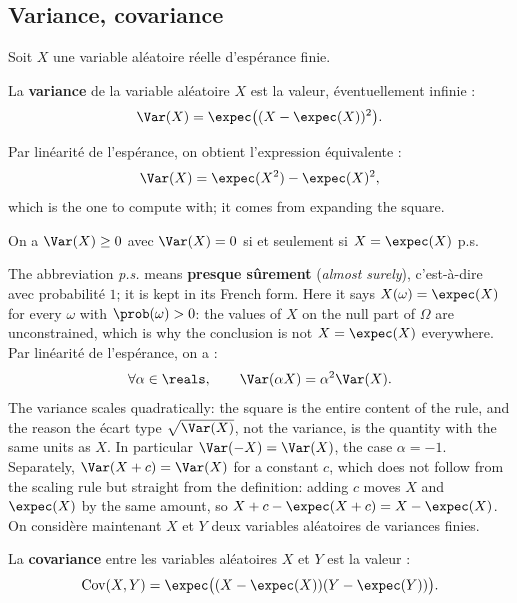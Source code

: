 \subsection{Variance, covariance}

Soit $X$ une variable aléatoire réelle d'espérance finie.

\begin{definition}[Variance]
  La \textbf{variance} de la variable aléatoire $X$ est la valeur, éventuellement
  infinie :
  \[ \Var(X) = \expec\big( (X - \expec(X))^{2} \big). \]
\end{definition}

Par linéarité de l'espérance, on obtient l'expression équivalente :
\[ \Var(X) = \expec(X^{2}) - \expec(X)^{2}, \]
which is the one to compute with; it comes from expanding the square.

\begin{prop}
  On a $\Var(X) \ge 0$ avec $\Var(X) = 0$ si et seulement si $X = \expec(X)$ p.s.
\end{prop}

The abbreviation \textit{p.s.} means \textbf{presque sûrement} (\textit{almost
surely}), c'est-à-dire avec probabilité $1$; it is kept in its French form. Here it says
$X(\omega) = \expec(X)$ for every $\omega$ with $\prob(\omega) > 0$: the
values of $X$ on the null part of $\Omega$ are unconstrained, which is why the
conclusion is not $X = \expec(X)$ everywhere.\\

Par linéarité de l'espérance, on a :
\[ \forall \alpha \in \reals, \qquad \Var(\alpha X) = \alpha^{2} \Var(X). \]
The variance scales quadratically: the square is the entire content of the
rule, and the reason the écart type $\sqrt{\Var(X)}$, not the variance, is the
quantity with the same units as $X$. In particular $\Var(-X) = \Var(X)$, the case $\alpha = -1$. Separately,
$\Var(X + c) = \Var(X)$ for a constant $c$, which does not follow from the
scaling rule but straight from the definition: adding $c$ moves $X$ and
$\expec(X)$ by the same amount, so $X + c - \expec(X+c) = X - \expec(X)$.\\

On considère maintenant $X$ et $Y$ deux variables aléatoires de variances finies.

\begin{definition}[Covariance]
  La \textbf{covariance} entre les variables aléatoires $X$ et $Y$ est la
  valeur :
  \[ \Cov(X,Y) = \expec\big( (X - \expec(X))(Y - \expec(Y)) \big). \]
\end{definition}

